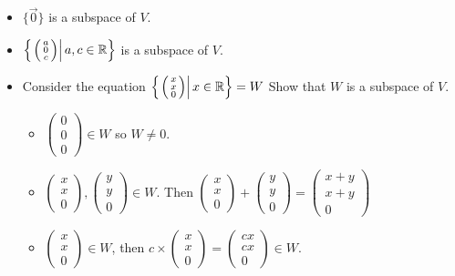   \begin{itemize}
    \item $\{\vec{0}\}$ is a subspace of $V$.
    \item $\left\{\left.\left(\begin{smallmatrix}a\\0\\c\end{smallmatrix}\right)\right|a,c\in\mathbb{R}\right\}$ is a subspace of $V$.
    \item Consider the equation $\left\{\left.\left(\begin{smallmatrix}x\\x\\0\end{smallmatrix}\right)\right|x\in\mathbb{R}\right\}=W$ Show that $W$ is a subspace of $V$.
    \begin{itemize}
      \item $\left(\begin{smallmatrix}0\\0\\0\end{smallmatrix}\right)\in W$ so $W\neq0$.
      \item $\left(\begin{smallmatrix}x\\x\\0\end{smallmatrix}\right),\left(\begin{smallmatrix}y\\y\\0\end{smallmatrix}\right)\in W$. Then $\left(\begin{smallmatrix}x\\x\\0\end{smallmatrix}\right)+\left(\begin{smallmatrix}y\\y\\0\end{smallmatrix}\right)=\left(\begin{smallmatrix}x+y\\x+y\\0\end{smallmatrix}\right)$
      \item $\left(\begin{smallmatrix}x\\x\\0\end{smallmatrix}\right)\in W$, then $c\times\left(\begin{smallmatrix}x\\x\\0\end{smallmatrix}\right)=\left(\begin{smallmatrix}cx\\cx\\0\end{smallmatrix}\right)\in W$.

\end{itemize}
\end{itemize}
